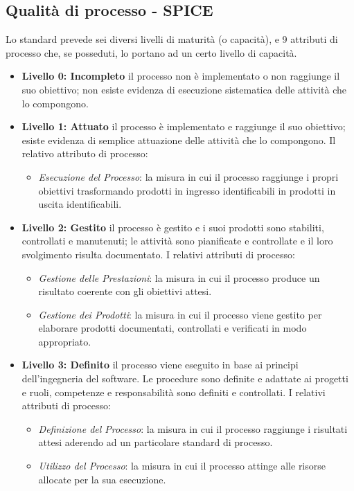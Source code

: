 	\subsection{Qualità di processo - SPICE}
	Lo standard prevede sei diversi livelli di maturità (o capacità), e 9 attributi di processo che, se posseduti, lo portano ad un certo livello di 			capacità.
	\begin{itemize}
	\item \textbf{Livello 0: Incompleto} il processo non è implementato o non raggiunge il suo obiettivo;   non esiste evidenza di esecuzione 					sistematica delle attività che lo compongono.
	 \item \textbf{Livello 1: Attuato} il processo è implementato e raggiunge il suo obiettivo; esiste evidenza di semplice attuazione delle attività 			che lo compongono.
	Il relativo attributo di processo:
		\begin{itemize}
			\item \emph{Esecuzione del Processo}: la misura in cui il processo raggiunge i propri obiettivi trasformando   prodotti in ingresso 						identificabili in prodotti in uscita identificabili.
		\end{itemize}
	\item \textbf{Livello 2: Gestito} il processo è gestito e i suoi prodotti sono stabiliti, controllati e manutenuti; le attività sono pianificate e 			controllate e il loro svolgimento risulta documentato.
	I relativi attributi di processo:
		\begin{itemize}
			\item \emph{Gestione delle Prestazioni}: la misura in cui il processo produce un risultato coerente con gli obiettivi attesi.
			\item \emph{Gestione dei Prodotti}: la misura in cui il processo viene gestito per elaborare prodotti documentati, controllati e verificati 				in modo appropriato.
		\end{itemize}
	
	\item \textbf{Livello 3: Definito} il processo viene eseguito in base ai principi dell'ingegneria del software. Le procedure sono definite e 				adattate ai progetti e ruoli, competenze e responsabilità sono definiti e controllati.
	I relativi attributi di processo:
		\begin{itemize}
			\item \emph{Definizione del Processo}: la misura in cui il processo raggiunge i risultati attesi aderendo ad un particolare standard di 					processo.
			\item \emph{Utilizzo del Processo}: la misura in cui il processo attinge alle risorse allocate per la sua esecuzione.	
		\end{itemize}
		

\end{itemize}
